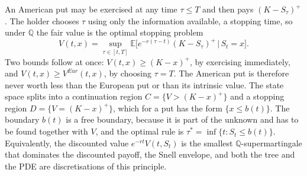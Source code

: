 An American put may be exercised at any time $\tau\le T$ and then pays $(K-S_\tau)^+$.
The holder chooses $\tau$ using only the information available, a stopping time, so under $\mathbb Q$ the fair value is the optimal stopping problem
\begin{equation}\label{eq:V}
 V(t,x)=\sup_{\tau\in[t,T]}\mathbb E\Big[e^{-r(\tau-t)}(K-S_\tau)^+\,\Big|\,S_t=x\Big].
\end{equation}
Two bounds follow at once: $V(t,x)\ge(K-x)^+$, by exercising immediately, and $V(t,x)\ge V^{Eur}(t,x)$, by choosing $\tau=T$.
The American put is therefore never worth less than the European put or than its intrinsic value.
The state space splits into a continuation region $C=\{V>(K-x)^+\}$ and a stopping region $D=\{V=(K-x)^+\}$, which for a put has the form $\{x\le b(t)\}$.
The boundary $b(t)$ is a free boundary, because it is part of the unknown and has to be found together with $V$, and the optimal rule is $\tau^*=\inf\{t:S_t\le b(t)\}$.
Equivalently, the discounted value $e^{-rt}V(t,S_t)$ is the smallest $\mathbb Q$-supermartingale that dominates the discounted payoff, the Snell envelope, and both the tree and the PDE are discretisations of this principle.
